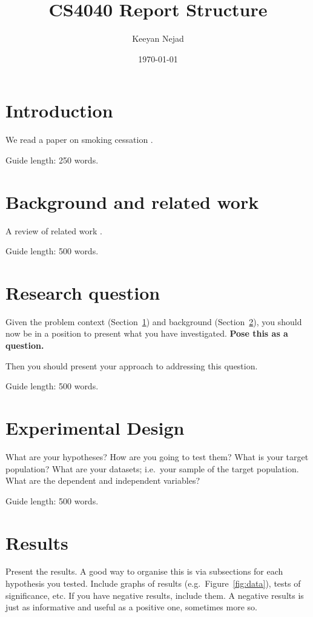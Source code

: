 \documentclass{csfourzero}
\title{CS4040 Report Structure}
\author{Keeyan Nejad}
\date{\today}
\begin{document}
\maketitle


\section{Introduction}
\label{sec:intro}

We read a paper on smoking cessation \cite{reiter2003lessons}.

Guide length: 250 words.

\section{Background and related work}
\label{sec:lit}

A review of related work \cite{p2pbookv2,macdonald2016summarising,p2pwiki}.

Guide length: 500 words.

\section{Research question}
\label{sec:rq}

Given the problem context (Section~\ref{sec:intro}) and background
(Section~\ref{sec:lit}), you should now be in a position to present
what you have investigated. \textbf{Pose this as a question.}

Then you should present your approach to addressing this
question.

Guide length: 500 words.

\section{Experimental Design}
\label{sec:exp}

What are your hypotheses? How are you going to test them? What is your
target population? What are your datasets; i.e.\ your sample of the
target population. What are the dependent and independent variables?

Guide length: 500 words.

\section{Results}
\label{sec:results}

Present the results. A good way to organise this is via subsections
for each hypothesis you tested. Include graphs of results
(e.g.\ Figure~\ref{fig:data}), tests of significance, etc. If you have
negative results, include them. A negative results is just as
informative and useful as a positive one, sometimes more so.
\end{document}
